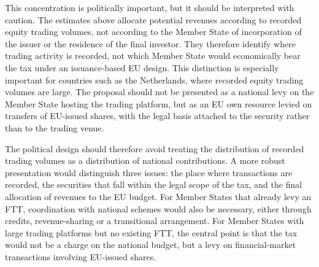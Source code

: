 \documentclass[../../main]{subfiles}
\begin{document}
This concentration is politically important, but it should be interpreted with caution. The estimates above allocate potential revenues according to recorded equity trading volumes, not according to the Member State of incorporation of the issuer or the residence of the final investor. They therefore identify where trading activity is recorded, not which Member State would economically bear the tax under an issuance-based EU design. This distinction is especially important for countries such as the Netherlands, where recorded equity trading volumes are large. The proposal should not be presented as a national levy on the Member State hosting the trading platform, but as an EU own resource levied on transfers of EU-issued shares, with the legal basis attached to the security rather than to the trading venue.

The political design should therefore avoid treating the distribution of recorded trading volumes as a distribution of national contributions. A more robust presentation would distinguish three issues: the place where transactions are recorded, the securities that fall within the legal scope of the tax, and the final allocation of revenues to the EU budget. For Member States that already levy an FTT, coordination with national schemes would also be necessary, either through credits, revenue-sharing or a transitional arrangement. For Member States with large trading platforms but no existing FTT, the central point is that the tax would not be a charge on the national budget, but a levy on financial-market transactions involving EU-issued shares.

\newpage
\end{document}
